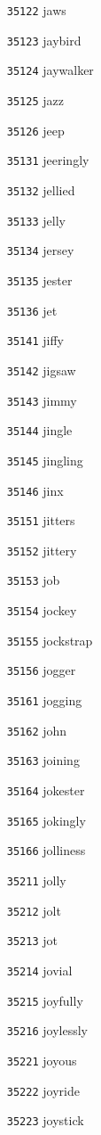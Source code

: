 \documentclass[twoside,11pt]{article}
\begin{document}
\begin{multicols}{5}
\begin{enumerate}
\item[\texttt{35122}] jaws
\item[\texttt{35123}] jaybird
\item[\texttt{35124}] jaywalker
\item[\texttt{35125}] jazz
\item[\texttt{35126}] jeep
\item[\texttt{35131}] jeeringly
\item[\texttt{35132}] jellied
\item[\texttt{35133}] jelly
\item[\texttt{35134}] jersey
\item[\texttt{35135}] jester
\item[\texttt{35136}] jet
\item[\texttt{35141}] jiffy
\item[\texttt{35142}] jigsaw
\item[\texttt{35143}] jimmy
\item[\texttt{35144}] jingle
\item[\texttt{35145}] jingling
\item[\texttt{35146}] jinx
\item[\texttt{35151}] jitters
\item[\texttt{35152}] jittery
\item[\texttt{35153}] job
\item[\texttt{35154}] jockey
\item[\texttt{35155}] jockstrap
\item[\texttt{35156}] jogger
\item[\texttt{35161}] jogging
\item[\texttt{35162}] john
\item[\texttt{35163}] joining
\item[\texttt{35164}] jokester
\item[\texttt{35165}] jokingly
\item[\texttt{35166}] jolliness
\item[\texttt{35211}] jolly
\item[\texttt{35212}] jolt
\item[\texttt{35213}] jot
\item[\texttt{35214}] jovial
\item[\texttt{35215}] joyfully
\item[\texttt{35216}] joylessly
\item[\texttt{35221}] joyous
\item[\texttt{35222}] joyride
\item[\texttt{35223}] joystick

\end{enumerate}
\end{multicols}
\end{document}
